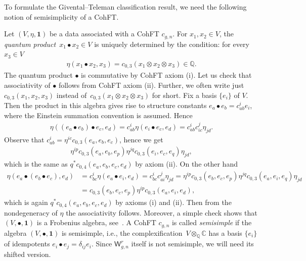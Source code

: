 \documentclass[pdftex]{sigma}
\def\b1{{\mathbf 1}}
\def\W{\mathsf{W}}
\numberwithin{equation}{section}
\begin{document}
To formulate the Givental--Teleman classification result, we need the following notion of semisimplicity of a CohFT.

Let $(V,\eta,\b1)$ be a data associated with a CohFT $c_{g,n}$.
For $x_1, x_2\in V$, the {\em quantum product}~${x_1 \bullet x_2\in V}$ is uniquely determined by the condition:
for every $x_3\in V$
\begin{align*}
\eta(x_1 \bullet x_2, x_3) = c_{0,3}(x_1 \otimes x_2 \otimes x_3)\in \mathbb{Q} .\end{align*}
The quantum product $\bullet$ is commutative by CohFT axiom (i). Let us check that associativity of $\bullet$ follows from CohFT axiom (ii).
Further, we often write just $c_{0,3}(x_1, x_2, x_3)$ instead of~${c_{0,3}(x_1 \otimes x_2 \otimes x_3)}$ for short.
Fix a basis $\{e_i\}$ of $V$. Then the product in this algebra gives rise to structure constants $e_a \bullet e_b = c^{i}_{ab}e_i$, where the Einstein summation convention is assumed. Hence
\begin{align*}
\eta((e_a\bullet e_b)\bullet e_c,e_d) = c^{i}_{ab} \eta(e_i\bullet e_c, e_d)
=c^{i}_{ab} c^{j}_{ic} \eta_{jd}.
\end{align*}
Observe that $c^{i}_{ab} = \eta^{ic}c_{0,3}(e_a,e_b,e_c)$, hence we get
\begin{align*}
\eta^{ip}c_{0,3}(e_a,e_b,e_p)\eta^{jq}c_{0,3}(e_i,e_c,e_q)\eta_{jd},
\end{align*}
which is the same as $q^{*}c_{0,4}(e_a,e_b,e_c,e_d)$ by axiom (ii). On the other hand
\begin{align*}
\eta(e_a\bullet (e_b\bullet e_c),e_d)& = c^{i}_{bc} \eta(e_a\bullet e_i, e_d)
=c^{i}_{bc} c^{j}_{ai} \eta_{jd}
=\eta^{ip}c_{0,3}(e_b,e_c,e_p)\eta^{jq}c_{0,3}(e_a,e_i,e_q)\eta_{jd} \\
&= c_{0,3}(e_b,e_c,e_p)\eta^{ip}c_{0,3}(e_a,e_i,e_d),
\end{align*}
which is again $q^{*}c_{0,4}(e_a,e_b,e_c,e_d)$ by axioms (i) and (ii). Then from the nondegeneracy of $\eta$ the associativity follows. Moreover, a simple check shows that $(V,\bullet,\b1)$ is a Frobenius algebra, see~\cite{K03}.
A CohFT $c_{g,n}$ is called \emph{semisimple} if the algebra $(V,\bullet,\b1)$ is semisimple, i.e., the complexification~${V \otimes_{\mathbb{Q}} \mathbb{C}}$ has a basis $\{e_i\}$ of idempotents
$e_i\bullet e_j = \delta_{ij}e_i$.
Since $\W^r_{g,n}$ itself is not semisimple, we will need its shifted version.
\end{document}
